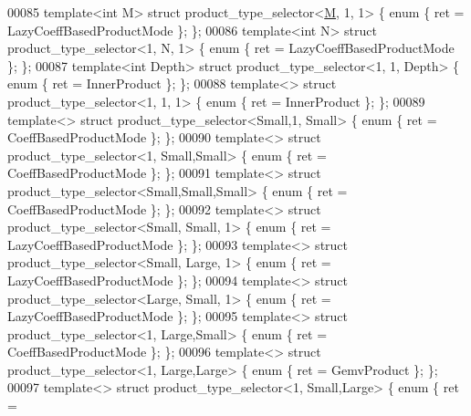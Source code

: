 \begin{DoxyCode}
00085 \textcolor{keyword}{template}<\textcolor{keywordtype}{int} M>         \textcolor{keyword}{struct }product\_type\_selector<\hyperlink{group___core___module_class_eigen_1_1_matrix}{M}, 1, 1>            \{ \textcolor{keyword}{enum} \{ ret = 
      LazyCoeffBasedProductMode \}; \};
00086 \textcolor{keyword}{template}<\textcolor{keywordtype}{int} N>         \textcolor{keyword}{struct }product\_type\_selector<1, N, 1>            \{ \textcolor{keyword}{enum} \{ ret = 
      LazyCoeffBasedProductMode \}; \};
00087 \textcolor{keyword}{template}<\textcolor{keywordtype}{int} Depth>     \textcolor{keyword}{struct }product\_type\_selector<1,    1,    Depth>  \{ \textcolor{keyword}{enum} \{ ret = InnerProduct \}; \};
00088 \textcolor{keyword}{template}<>              \textcolor{keyword}{struct }product\_type\_selector<1,    1,    1>      \{ \textcolor{keyword}{enum} \{ ret = InnerProduct \}; \};
00089 \textcolor{keyword}{template}<>              \textcolor{keyword}{struct }product\_type\_selector<Small,1,    Small>  \{ \textcolor{keyword}{enum} \{ ret = 
      CoeffBasedProductMode \}; \};
00090 \textcolor{keyword}{template}<>              \textcolor{keyword}{struct }product\_type\_selector<1,    Small,Small>  \{ \textcolor{keyword}{enum} \{ ret = 
      CoeffBasedProductMode \}; \};
00091 \textcolor{keyword}{template}<>              \textcolor{keyword}{struct }product\_type\_selector<Small,Small,Small>  \{ \textcolor{keyword}{enum} \{ ret = 
      CoeffBasedProductMode \}; \};
00092 \textcolor{keyword}{template}<>              \textcolor{keyword}{struct }product\_type\_selector<Small, Small, 1>    \{ \textcolor{keyword}{enum} \{ ret = 
      LazyCoeffBasedProductMode \}; \};
00093 \textcolor{keyword}{template}<>              \textcolor{keyword}{struct }product\_type\_selector<Small, Large, 1>    \{ \textcolor{keyword}{enum} \{ ret = 
      LazyCoeffBasedProductMode \}; \};
00094 \textcolor{keyword}{template}<>              \textcolor{keyword}{struct }product\_type\_selector<Large, Small, 1>    \{ \textcolor{keyword}{enum} \{ ret = 
      LazyCoeffBasedProductMode \}; \};
00095 \textcolor{keyword}{template}<>              \textcolor{keyword}{struct }product\_type\_selector<1,    Large,Small>  \{ \textcolor{keyword}{enum} \{ ret = 
      CoeffBasedProductMode \}; \};
00096 \textcolor{keyword}{template}<>              \textcolor{keyword}{struct }product\_type\_selector<1,    Large,Large>  \{ \textcolor{keyword}{enum} \{ ret = GemvProduct \}; \};
00097 \textcolor{keyword}{template}<>              \textcolor{keyword}{struct }product\_type\_selector<1,    Small,Large>  \{ \textcolor{keyword}{enum} \{ ret = 

\end{DoxyCode}
